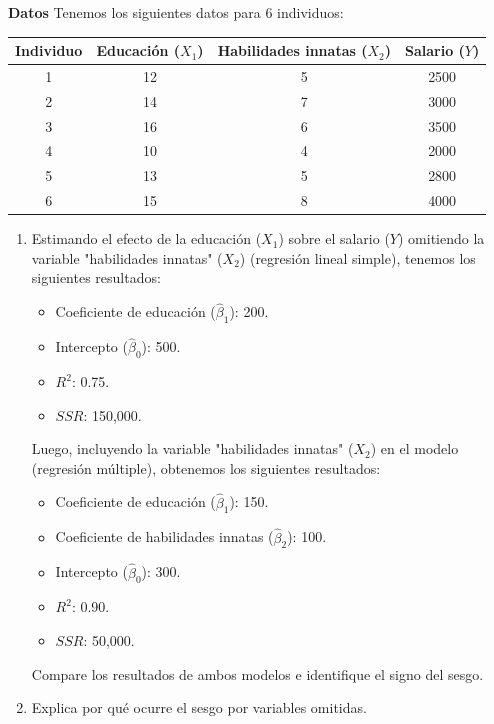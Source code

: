 \documentclass[10pt,a4paper]{article}
\begin{document}
\textbf{Datos}
Tenemos los siguientes datos para 6 individuos:

\begin{center}
\begin{tabular}{|c|c|c|c|}
\hline
Individuo & Educación (\( X_1 \)) & Habilidades innatas (\( X_2 \)) & Salario (\( Y \)) \\
\hline
1 & 12 & 5 & 2500 \\
2 & 14 & 7 & 3000 \\
3 & 16 & 6 & 3500 \\
4 & 10 & 4 & 2000 \\
5 & 13 & 5 & 2800 \\
6 & 15 & 8 & 4000 \\
\hline
\end{tabular}
\end{center}

\begin{enumerate}
    \item Estimando el efecto de la educación (\( X_1 \)) sobre el salario (\( Y \)) omitiendo la variable "habilidades innatas" (\( X_2 \)) (regresión lineal simple), tenemos los siguientes resultados:
    \begin{itemize}
    \item Coeficiente de educación (\( \hat{\beta}_1 \)): 200.
    \item Intercepto (\( \hat{\beta}_0 \)): 500.
    \item \( R^2 \): 0.75.
    \item \( SSR \): 150,000.
    \end{itemize}
    Luego, incluyendo la variable "habilidades innatas" (\( X_2 \)) en el modelo (regresión múltiple), obtenemos los siguientes resultados:
    \begin{itemize}
    \item Coeficiente de educación (\( \hat{\beta}_1 \)): 150.
    \item Coeficiente de habilidades innatas (\( \hat{\beta}_2 \)): 100.
    \item Intercepto (\( \hat{\beta}_0 \)): 300.
    \item \( R^2 \): 0.90.
    \item \( SSR \): 50,000.
\end{itemize}
Compare los resultados de ambos modelos e identifique el signo del sesgo.

    \item Explica por qué ocurre el sesgo por variables omitidas.
\end{enumerate}
\end{document}
